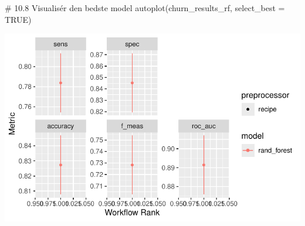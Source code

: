 \documentclass[
  11pt,
  letterpaper,
  DIV=11,
  numbers=noendperiod]{scrartcl}
\newenvironment{Shaded}{\begin{snugshade}}{\end{snugshade}}
\newcommand{\AttributeTok}[1]{\textcolor[rgb]{0.40,0.45,0.13}{#1}}
\newcommand{\CommentTok}[1]{\textcolor[rgb]{0.37,0.37,0.37}{#1}}
\newcommand{\ConstantTok}[1]{\textcolor[rgb]{0.56,0.35,0.01}{#1}}
\newcommand{\FunctionTok}[1]{\textcolor[rgb]{0.28,0.35,0.67}{#1}}
\newcommand{\NormalTok}[1]{\textcolor[rgb]{0.00,0.23,0.31}{#1}}
\begin{document}
\begin{Shaded}
\begin{Highlighting}[]
\CommentTok{\# 10.8 Visualisér den bedste model}
\FunctionTok{autoplot}\NormalTok{(churn\_results\_rf, }\AttributeTok{select\_best =} \ConstantTok{TRUE}\NormalTok{)}
\end{Highlighting}
\end{Shaded}

\includegraphics{Quarto_files/figure-pdf/unnamed-chunk-15-1.pdf}
\end{document}
